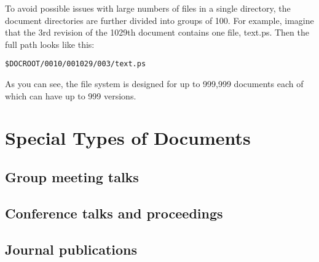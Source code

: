 \documentclass[12pt]{article}
\begin{document}
To avoid possible issues with large numbers of files in a single 
directory, the document directories are further divided into groups of 
100. For example, imagine that the 3rd revision of the 1029th document 
contains one file, text.ps. Then the full path looks like this:

\texttt{\$DOCROOT/0010/001029/003/text.ps}

As you can see, the file system is designed for up to 999,999 documents 
each of which can have up to 999 versions.

\section{Special Types of Documents}

\subsection{Group meeting talks}

\subsection{Conference talks and proceedings}

\subsection{Journal publications}


                                                                                      
\end{document}
